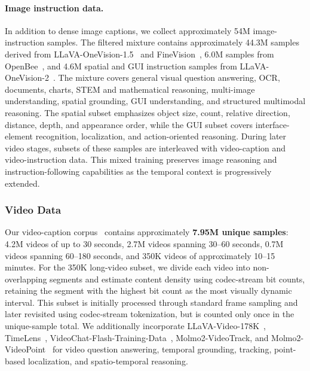 \paragraph{Image instruction data.}
In addition to dense image captions, we collect approximately 54M image-instruction samples. The filtered mixture contains approximately 44.3M samples derived from LLaVA-OneVision-1.5~\citep{li2024llavaonevision15} and FineVision~\citep{finevision25m}, 6.0M samples from OpenBee~\citep{zhang2026beehighqualitycorpusfullstack}, and 4.6M spatial and GUI instruction samples from LLaVA-OneVision-2~\citep{llavaonevision2}.
The mixture covers general visual question answering, OCR, documents, charts, STEM and mathematical reasoning, multi-image understanding, spatial grounding, GUI understanding, and structured multimodal reasoning. The spatial subset emphasizes object size, count, relative direction, distance, depth, and appearance order, while the GUI subset covers interface-element recognition, localization, and action-oriented reasoning.
During later video stages, subsets of these samples are interleaved with video-caption and video-instruction data. This mixed training preserves image reasoning and instruction-following capabilities as the temporal context is progressively extended.


\subsubsection{Video Data}
\label{sec:video_data}
Our video-caption corpus~\citep{llavaonevision2} contains approximately \textbf{7.95M unique samples}: 4.2M videos of up to 30 seconds, 2.7M videos spanning 30--60 seconds, 0.7M videos spanning 60--180 seconds, and 350K videos of approximately 10--15 minutes. For the 350K long-video subset, we divide each video into non-overlapping segments and estimate content density using codec-stream bit counts, retaining the segment with the highest bit count as the most visually dynamic interval. This subset is initially processed through standard frame sampling and later revisited using codec-stream tokenization, but is counted only once in the unique-sample total. We additionally incorporate LLaVA-Video-178K~\citep{zhang2025llavavideovideoinstructiontuning}, TimeLens~\citep{zhang2026timelensrethinkingvideotemporal}, VideoChat-Flash-Training-Data~\citep{videochatflash2025}, Molmo2-VideoTrack, and Molmo2-VideoPoint~\citep{clark2026molmo2} for video question answering, temporal grounding, tracking, point-based localization, and spatio-temporal reasoning.

